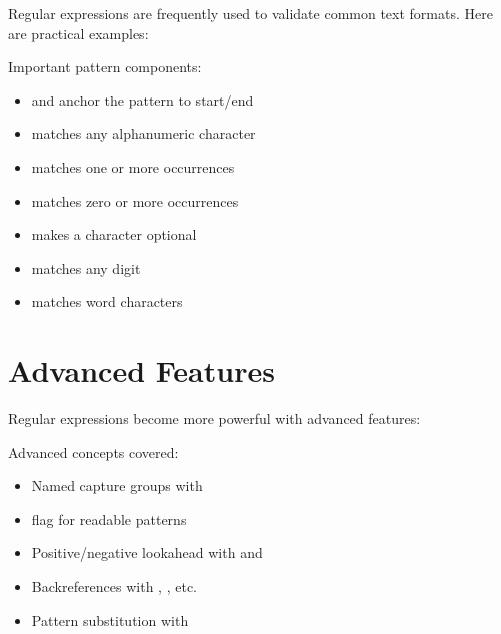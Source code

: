 Regular expressions are frequently used to validate common text formats. Here are practical examples:

\begin{macterminal}

\end{macterminal}

Important pattern components:
\begin{itemize}
    \item \code{\string^} and \code{\string$} anchor the pattern to start/end
    \item \code{[a-zA-Z0-9]} matches any alphanumeric character
    \item \code{+} matches one or more occurrences
    \item \code{*} matches zero or more occurrences
    \item {} makes a character optional
    \item {} matches any digit
    \item {} matches word characters
\end{itemize}

\section{Advanced Features}

Regular expressions become more powerful with advanced features:

\begin{macterminal}

\end{macterminal}

Advanced concepts covered:
\begin{itemize}
    \item Named capture groups with 
    \item {} flag for readable patterns
    \item Positive/negative lookahead with  and 
    \item Backreferences with , , etc.
    \item Pattern substitution with 
\end{itemize}

